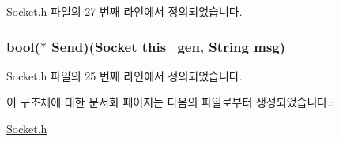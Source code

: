 Socket.\-h 파일의 27 번째 라인에서 정의되었습니다.

\hypertarget{struct___socket_a0d82d1d1d78c09f2fa3a3e5709527ae5}{
\subsubsection[{Send}]{\setlength{\rightskip}{0pt plus 5cm}bool($\ast$  Send)({\bf Socket} this\-\_\-gen, {\bf String} msg)}}\label{struct___socket_a0d82d1d1d78c09f2fa3a3e5709527ae5}


Socket.\-h 파일의 25 번째 라인에서 정의되었습니다.



이 구조체에 대한 문서화 페이지는 다음의 파일로부터 생성되었습니다.\-:\begin{DoxyCompactItemize}
\item 
\hyperlink{_socket_8h}{Socket.\-h}\end{DoxyCompactItemize}
